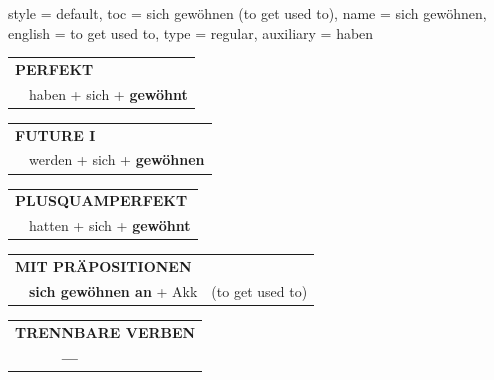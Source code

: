 \begin{verbentry}{
  style = {default},
  toc = {sich gewöhnen (to get used to)},
  name = {sich gewöhnen},
  english = {to get used to},
  type = {regular},
  auxiliary = {haben}
}
 \begin{tabular}{rl}
     \multicolumn{2}{l}{\textbf{PERFEKT}}\\
   & haben + sich + \textbf{gewöhnt}\\
  \end{tabular}
\hfill
   \begin{tabular}{rl}
    \multicolumn{2}{l}{\textbf{FUTURE I} }\\
   & werden + sich + \textbf{gewöhnen}\\
  \end{tabular}
\hfill
   \begin{tabular}{rl}
      \multicolumn{2}{l}{\textbf{PLUSQUAMPERFEKT}}\\
   & hatten + sich + \textbf{gewöhnt}\\
  \end{tabular}

   \vspace{10pt}

   \begin{tabular}{lll}
      \multicolumn{3}{l}{\textbf{MIT PRÄPOSITIONEN}}\\
& \textbf{sich gewöhnen an} + Akk & (to get used to)\\
\end{tabular}
  \hfill
   \begin{tabular}{lll}
\multicolumn{3}{l}{\textbf{TRENNBARE VERBEN}}\\
& \textbf{---} & \\
\end{tabular}

  \vspace{-5pt}
\end{verbentry}

